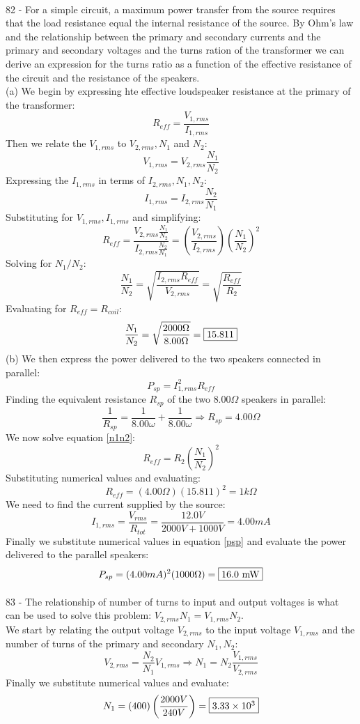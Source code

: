\documentclass{report}
\begin{document}
\paragraph{}
82 - For a simple circuit, a maximum power transfer from the source requires that the load resistance equal the internal resistance of the source. By Ohm's law and the relationship between the primary and secondary currents and the primary and secondary voltages and the turns ration of the transformer we can derive an expression for the turns ratio as a function of the effective resistance of the circuit and the resistance of the speakers.\\
(a) We begin by expressing hte effective loudspeaker resistance at the primary of the transformer:
$$R_{eff} = \frac{V_{1,rms}}{I_{1,rms}}$$
Then we relate the $V_{1,rms}$ to $V_{2,rms}, N_1$ and $N_2$:
$$V_{1,rms} = V_{2,rms} \frac{N_1}{N_2}$$
Expressing the $I_{1,rms}$ in terms of $I_{2,rms}, N_1, N_2$:
$$I_{1,rms} = I_{2,rms} \frac{N_2}{N_1}$$
Substituting for $V_{1,rms}, I_{1,rms}$ and simplifying:
$$R_{eff} = \frac{V_{2,rms} \frac{N_1}{N_2}}{I_{2,rms} \frac{N_2}{N_1}} = \left( \frac{V_{2,rms}}{I_{2,rms}} \right) \left( \frac{N_1}{N_2} \right)^2$$
Solving for $N_1 / N_2$:
\begin{equation}\label{n1n2}
  \frac{N_1}{N_2} = \sqrt{\frac{I_{2,rms}R_{eff}}{V_{2,rms}}} = \sqrt{\frac{R_{eff}}{R_2}}
\end{equation}
Evaluating for $R_{eff} = R_{coil}$:
$$\frac{N_1}{N_2} = \sqrt{\frac{2000 \Omega}{8.00 \Omega}} = \fbox{15.811}$$
(b) We then express the power delivered to the two speakers connected in parallel:
\begin{equation}\label{psp}
  P_{sp} = I_{1,rms}^2R_{eff}
\end{equation}
Finding the equivalent resistance $R_{sp}$ of the two $8.00 \Omega$ speakers in parallel:
$$\frac{1}{R_{sp}} = \frac{1}{8.00 \omega} + \frac{1}{8.00 \omega} \Rightarrow R_{sp} = 4.00 \Omega$$
We now solve equation \ref{n1n2}:
$$R_{eff} = R_2 \left( \frac{N_1}{N_2} \right)^2$$
Substituting numerical values and evaluating:
$$R_{eff} = (4.00 \Omega)(15.811)^2 = 1 k\Omega$$
We need to find the current supplied by the source:
$$I_{1,rms} = \frac{V_{rms}}{R_{tot}} = \frac{12.0 V}{2000 V + 1000 V} = 4.00 mA$$
Finally we substitute numerical values in equation \ref{psp} and evaluate the power delivered to the parallel speakers:
$$P_{sp} = (4.00 mA)^2(1000 \Omega) = \fbox{16.0 mW}$$

\paragraph{}
83 - The relationship of number of turns to input and output voltages is what can be used to solve this problem: $V_{2,rms}N_1 = V_{1,rms}N_2$.\\
We start by relating the output voltage $V_{2,rms}$ to the input voltage $V_{1,rms}$ and the number of turns of the primary and secondary $N_1, N_2$:
$$V_{2,rms} = \frac{N_2}{N_1}V_{1,rms} \Rightarrow N_1 = N_2 \frac{V_{1,rms}}{V_{2,rms}}$$
Finally we substitute numerical values and evaluate:
$$N_1 = (400)\left( \frac{2000 V}{240 V} \right) = \fbox{$3.33 \times 10 ^3$}$$
\end{document}
